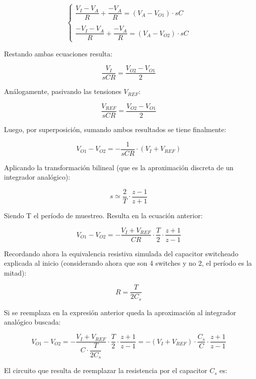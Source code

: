 \documentclass[assd_tp3_main.tex]{subfiles}
\begin{document}
\[
\left\lbrace
\begin{array}{l}
\dfrac{V_I-V_A}{R} + \dfrac{-V_A}{R} = (V_A-V_{O1}) \cdot sC \\
\\
\dfrac{-V_I-V_A}{R} + \dfrac{-V_A}{R} = (V_A-V_{O2}) \cdot sC
\end{array}
\right.
\] 

Restando ambas ecuaciones resulta:

\[
\frac{V_I}{sCR} = \frac{V_{O2}-V_{O1}}{2}
\]

Análogamente, pasivando las tensiones $V_{REF}$:

\[
\frac{V_{REF}}{sCR} = \frac{V_{O2}-V_{O1}}{2}
\]

Luego, por superposición, sumando ambos resultados se tiene finalmente:

\[
V_{O1} - V_{O2} = -\frac{1}{sCR} \cdot (V_I + V_{REF})
\]

Aplicando la transformación bilineal (que es la aproximación discreta de un integrador analógico):

\[
s \simeq \frac{2}{T} \cdot \frac{z-1}{z+1}
\]

Siendo T el período de muestreo. Resulta en la ecuación anterior:

\[
V_{O1}-V_{O2} = -\frac{V_I+V_{REF}}{CR} \cdot \frac{T}{2} \cdot \frac{z+1}{z-1}
\]

Recordando ahora la equivalencia resistiva simulada del capacitor switcheado explicada al inicio (considerando ahora que son 4 switches y no 2, el período es la mitad):

\[
R = \frac{T}{2C_s}
\]

Si se reemplaza en la expresión anterior queda la aproximación al integrador analógico buscada:

\[
V_{O1}-V_{O2} = -\frac{V_I+V_{REF}}{C \cdot \dfrac{T}{2C_s}} \cdot \frac{T}{2} \cdot \frac{z+1}{z-1} = -(V_I + V_{REF}) \cdot \frac{C_s}{C} \cdot \frac{z+1}{z-1}
\]

El circuito que resulta de reemplazar la resistencia por el capacitor $C_s$ es:
\end{document}
